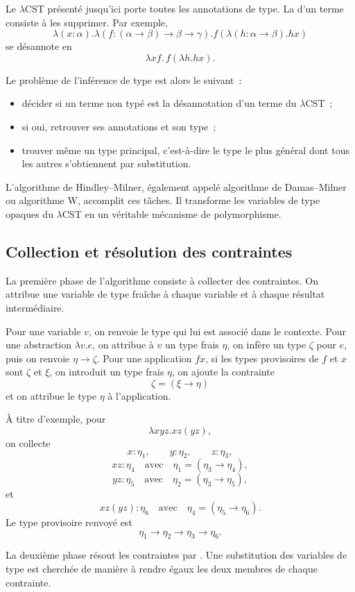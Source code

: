 \thingy Le $\lambda$CST présenté jusqu'ici porte toutes les annotations
de type. La  d'un terme consiste à les supprimer.
Par exemple,
\[
\lambda(x:\alpha).
\lambda(f:(\alpha\to\beta)\to\beta\to\gamma).
f(\lambda(h:\alpha\to\beta).hx)
\]
se désannote en
\[
\lambda xf.\,f(\lambda h.hx).
\]

Le problème de l'inférence de type est alors le suivant :
\begin{itemize}
\item décider si un terme non typé est la désannotation d'un terme du
  $\lambda$CST ;
\item si oui, retrouver ses annotations et son type ;
\item trouver même un type principal, c'est-à-dire le type le plus
  général dont tous les autres s'obtiennent par substitution.
\end{itemize}

L'algorithme de Hindley--Milner, également appelé algorithme de
Damas--Milner ou algorithme W, accomplit ces tâches. Il transforme les
variables de type opaques du $\lambda$CST en un véritable mécanisme de
polymorphisme.

\subsection{Collection et résolution des contraintes}

\thingy La première phase de l'algorithme consiste à collecter des
contraintes. On attribue une variable de type fraîche à chaque
variable et à chaque résultat intermédiaire.

Pour une variable $v$, on renvoie le type qui lui est associé dans le
contexte. Pour une abstraction $\lambda v.e$, on attribue à $v$ un
type frais $\eta$, on infère un type $\zeta$ pour $e$, puis on renvoie
$\eta\to\zeta$. Pour une application $fx$, si les types provisoires de
$f$ et $x$ sont $\zeta$ et $\xi$, on introduit un type frais $\eta$,
on ajoute la contrainte
\[
\zeta=(\xi\to\eta)
\]
et on attribue le type $\eta$ à l'application.

À titre d'exemple, pour
\[
\lambda xyz.xz(yz),
\]
on collecte
\[
x:\eta_1,\qquad y:\eta_2,\qquad z:\eta_3,
\]
\[
xz:\eta_4
\quad\text{avec}\quad
\eta_1=(\eta_3\to\eta_4),
\]
\[
yz:\eta_5
\quad\text{avec}\quad
\eta_2=(\eta_3\to\eta_5),
\]
et
\[
xz(yz):\eta_6
\quad\text{avec}\quad
\eta_4=(\eta_5\to\eta_6).
\]
Le type provisoire renvoyé est
\[
\eta_1\to\eta_2\to\eta_3\to\eta_6.
\]

\thingy La deuxième phase résout les contraintes par
. Une substitution des variables de type est
cherchée de manière à rendre égaux les deux membres de chaque
contrainte.

